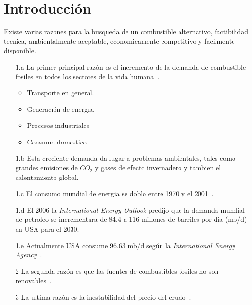 \documentclass[a4paper,10pt]{article}
\begin{document}
\section{Introducción}
Existe varias razones para la busqueda de un combustible alternativo, factibilidad tecnica,
 ambientalmente aceptable, economicamente competitivo y facilmente disponible.
\begin{itemize}
 \item[1.a] La primer principal razón  es el incremento de la demanda de combustible fosiles en todos los sectores de la vida humana~\cite{Kafuku2010}.
    \begin{itemize}
	  \item Transporte en general.
	  \item Generación de energia.
	  \item Procesos industriales.
	  \item Consumo domestico.
    \end{itemize}
 \item[1.b] Esta creciente demanda da lugar a problemas ambientales, tales como grandes 
  emisiones de $CO_2$ y gases de efecto invernadero y tambien el calentamiento global.
 \item[1.c] El consumo mundial de energia se doblo entre 1970 y el 2001~\cite{talebian2013}.
 \item[1.d] El 2006 la \emph{International Energy Outlook} predijo que la demanda mundial de petroleo 
  se incrementara de 84.4 a 116 millones de barriles por dia (mb/d) en USA para el 2030.
 \item[1.e] Actualmente USA consume 96.63 mb/d según la \emph{International Energy Agency}~\cite{iea2017}.
 \item[2] La segunda razón es que las fuentes de combustibles fosiles no son renovables~\cite{maceiras2011}. %
 \item[3] La ultima razón es la inestabilidad del precio del crudo~\cite{santori2012}. %
\end{itemize}
\end{document}
